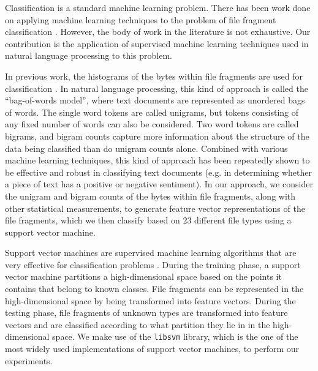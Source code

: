 \documentclass[letter,11pt]{article}
\begin{document}
Classification is a standard machine learning problem. There has been work done on applying machine learning techniques to the problem of file fragment classification \cite{Axelsson10, Conti10, Li10, Veenman07}. However, the body of work in the literature is not exhaustive. Our contribution is the application of supervised machine learning techniques used in natural language processing to this problem.

In previous work, the histograms of the bytes within file fragments are used for classification \cite{Li05, Li10, Stolfo05, Veenman07}. In natural language processing, this kind of approach is called the ``bag-of-words model'', where text documents are represented as unordered bags of words. The single word tokens are called unigrams, but tokens consisting of any fixed number of words can also be considered. Two word tokens are called bigrams, and bigram counts capture more information about the structure of the data being classified than do unigram counts alone. Combined with various machine learning techniques, this kind of approach has been repeatedly shown to be effective and robust in classifying text documents (e.g. in determining whether a piece of text has a positive or negative sentiment). In our approach, we consider the unigram and bigram counts of the bytes within file fragments, along with other statistical measurements, to generate feature vector representations of the file fragments, which we then classify based on 23 different file types using a support vector machine.

Support vector machines are supervised machine learning algorithms that are very effective for classification problems \cite{Li10}. During the training phase, a support vector machine partitions a high-dimensional space based on the points it contains that belong to known classes. File fragments can be represented in the high-dimensional space by being transformed into feature vectors. During the testing phase, file fragments of unknown types are transformed into feature vectors and are classified according to what partition they lie in in the high-dimensional space. We make use of the \texttt{libsvm} \cite{CC01a} library, which is the one of the most widely used implementations of support vector machines, to perform our experiments.
\end{document}
